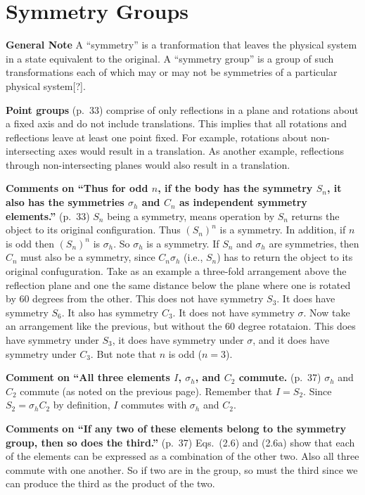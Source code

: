 \chapter{Symmetry Groups}

{\bf General Note} A ``symmetry'' is a tranformation that leaves the
physical system in a state equivalent to the original. A ``symmetry
group'' is a group of such transformations each of which may or may
not be symmetries of a particular physical system[?].

{\bf Point groups} (p.\ 33) comprise of only reflections in a plane and
rotations about a fixed axis and do not include translations. This
implies that all rotations and reflections leave at least one point
fixed. For example, rotations about non-intersecting axes would result
in a translation. As another example, reflections through
non-intersecting planes would also result in a translation.

{\bf Comments on ``Thus for odd $n$, if the body has the symmetry
  $S_n$, it also has the symmetries $\sigma_h$ and $C_n$ as
  independent symmetry elements.''} (p.\ 33) $S_n$ being a symmetry,
means operation by $S_n$ returns the object to its original
configuration. Thus $(S_n)^n$ is a symmetry. In addition, if $n$ is
odd then $(S_n)^n$ is $\sigma_h$. So $\sigma_h$ is a symmetry. If
$S_n$ and $\sigma_h$ are symmetries, then $C_n$ must also be a
symmetry, since $C_n \sigma_h$ (i.e., $S_n$) has to return the object
to its original confuguration. Take as an example a three-fold
arrangement above the reflection plane and one the same distance below
the plane where one is rotated by 60 degrees from the other.  This
does not have symmetry $S_3$. It does have symmetry $S_6$. It also has
symmetry $C_3$. It does not have symmetry $\sigma$.  Now take an
arrangement like the previous, but without the 60 degree
rotataion. This does have symmetry under $S_3$, it does have symmetry
under $\sigma$, and it does have symmetry under $C_3$. But note that
$n$ is odd ($n = 3$).

{\bf Comment on ``All three elements $I$, $\sigma_h$, and $C_2$
  commute.} (p.\ 37) $\sigma_h$ and $C_2$ commute (as noted on the
previous page). Remember that $I = S_2$. Since $S_2 = \sigma_h C_2$ by
definition, $I$ commutes with $\sigma_h$ and $C_2$.

{\bf Comments on ``If any two of these elements belong to the symmetry
  group, then so does the third.''} (p.\ 37) Eqs.\ (2.6) and (2.6a)
show that each of the elements can be expressed as a combination of
the other two. Also all three commute with one another. So if two are
in the group, so must the third since we can produce the third as the
product of the two.


